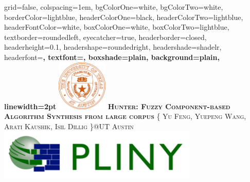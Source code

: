 \documentclass[landscape,final,a0paper,fontscale=0.285]{baposter}
\begin{document}
\begin{poster}%
  {
  grid=false,
  colspacing=1em,
  bgColorOne=white,
  bgColorTwo=white,
  borderColor=lightblue,
  headerColorOne=black,
  headerColorTwo=lightblue,
  headerFontColor=white,
  boxColorOne=white,
  boxColorTwo=lightblue,
  textborder=roundedleft,
  eyecatcher=true,
  headerborder=closed,
  headerheight=0.1\textheight,
  headershape=roundedright,
  headershade=shadelr,
  headerfont=\Large\bf\textsc, %
  textfont={\setlength{\parindent}{1.5em}},
  boxshade=plain,
  background=plain,
  linewidth=2pt
  }
  {\includegraphics[height=6.5em]{images/ut.png}} 
  {\bf\textsc{Hunter: Fuzzy Component-based Algorithm Synthesis from large corpus}\vspace{0.1em}}
  {\textsc{\{ Yu Feng, Yuepeng Wang, Arati Kaushik, Isil Dillig \}@UT Austin}}
  {%
    \includegraphics[height=6.5em]{images/pliny.png}
  }

    \newcommand{\colouredcircle}{%
      \tikz{\useasboundingbox (-0.2em,-0.32em) rectangle(0.2em,0.32em); \draw[draw=black,fill=lightblue,line width=0.03em] (0,0) circle(0.18em);}}


\end{poster}
\end{document}
